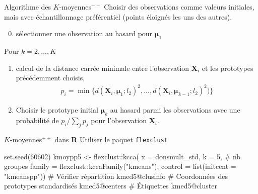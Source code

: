 \documentclass[
  ignorenonframetext,
]{beamer}
\newenvironment{Shaded}{\begin{snugshade}}{\end{snugshade}}
\newcommand{\AttributeTok}[1]{\textcolor[rgb]{0.40,0.45,0.13}{#1}}
\newcommand{\CommentTok}[1]{\textcolor[rgb]{0.37,0.37,0.37}{#1}}
\newcommand{\DecValTok}[1]{\textcolor[rgb]{0.68,0.00,0.00}{#1}}
\newcommand{\FunctionTok}[1]{\textcolor[rgb]{0.28,0.35,0.67}{#1}}
\newcommand{\NormalTok}[1]{\textcolor[rgb]{0.00,0.23,0.31}{#1}}
\newcommand{\OtherTok}[1]{\textcolor[rgb]{0.00,0.23,0.31}{#1}}
\newcommand{\SpecialCharTok}[1]{\textcolor[rgb]{0.37,0.37,0.37}{#1}}
\newcommand{\StringTok}[1]{\textcolor[rgb]{0.13,0.47,0.30}{#1}}
\providecommand{\tightlist}{%
  \setlength{\itemsep}{0pt}\setlength{\parskip}{0pt}}\usepackage{longtable,booktabs,array}
\begin{document}
\begin{frame}{Algorithme des \(K\)-moyennes\({}^{++}\)}
\protect\hypertarget{algorithme-des-k-moyennes}{}
Choisir des observations comme valeurs initiales, mais avec
échantillonnage préférentiel (points éloignés les uns des autres).

\begin{enumerate}
\setcounter{enumi}{-1}
\tightlist
\item
  sélectionner une observation au hasard pour \(\boldsymbol{\mu}_1\)
\end{enumerate}

Pour \(k=2, \ldots, K\)

\begin{enumerate}
\tightlist
\item
  calcul de la distance carrée minimale entre l'observation
  \(\mathbf{X}_i\) et les prototypes précédemment choisis,
  \begin{align*}
  p_i = \min \{d(\mathbf{X}_i, \boldsymbol{\mu}_1; l_2)^2, \ldots, d(\mathbf{X}_i, \boldsymbol{\mu}_{k-1}; l_2)^2)\}
  \end{align*}
\item
  Choisir le prototype initial \(\boldsymbol{\mu}_k\) au hasard parmi
  les observations avec une probabilité de \(p_i/\sum_{j} p_j\) pour
  l'observation \(\mathbf{X}_i\).
\end{enumerate}
\end{frame}

\begin{frame}[fragile]{\(K\)-moyennes\({}^{++}\) dans \textbf{R}}
\protect\hypertarget{k-moyennes-dans-r-1}{}
Utiliser le paquet \texttt{flexclust}

\begin{Shaded}
\begin{Highlighting}[numbers=left,,]
\FunctionTok{set.seed}\NormalTok{(}\DecValTok{60602}\NormalTok{)}
\NormalTok{kmoypp5 }\OtherTok{\textless{}{-}}\NormalTok{ flexclust}\SpecialCharTok{::}\FunctionTok{kcca}\NormalTok{(}
  \AttributeTok{x =}\NormalTok{ donsmult\_std,}
  \AttributeTok{k =} \DecValTok{5}\NormalTok{, }\CommentTok{\# nb groupes}
  \AttributeTok{family =}\NormalTok{ flexclust}\SpecialCharTok{::}\FunctionTok{kccaFamily}\NormalTok{(}\StringTok{"kmeans"}\NormalTok{),}
  \AttributeTok{control =} \FunctionTok{list}\NormalTok{(}\AttributeTok{initcent =} \StringTok{"kmeanspp"}\NormalTok{))}
\CommentTok{\# Vérifier répartition}
\NormalTok{kmed5}\SpecialCharTok{@}\NormalTok{clusinfo}
\CommentTok{\# Coordonnées des prototypes standardisés}
\NormalTok{kmed5}\SpecialCharTok{@}\NormalTok{centers}
\CommentTok{\# Étiquettes}
\NormalTok{kmed5}\SpecialCharTok{@}\NormalTok{cluster}
\end{Highlighting}
\end{Shaded}
\end{frame}
\end{document}

